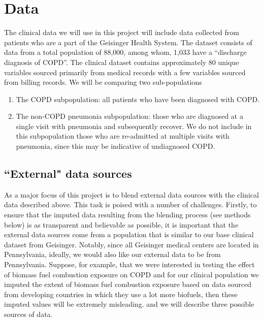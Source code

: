 \documentclass{article}
\begin{document}
\section{Data}

The clinical data we will use in this project will include data collected from patients who are a part of the Geisinger Health System. The dataset consists of data from a total population of 88,000, among whom, 1,033 have a ``discharge diagnosis of COPD''. The clinical dataset contains approximately 80 unique variables sourced primarily from medical records with a few variables sourced from billing records. We will be comparing two sub-populations

\begin{enumerate}
\item The COPD subpopulation: all patients who have been diagnosed with COPD.
\item The non-COPD pneumonia subpopulation: those who are diagnosed at a single visit with pneumonia and subsequently recover. We do not include in this subpopulation those who are re-admitted at multiple visits with pneumonia, since this may be indicative of undiagnosed COPD.
\end{enumerate}



\subsection{``External" data sources}

As a major focus of this project is to blend external data sources with the clinical data described above. This task is poised with a number of challenges. Firstly, to ensure that the imputed data resulting from the blending process (see methods below) is as transparent and believable as possible, it is important that the external data sources come from a population that is similar to our base clinical dataset from Geisinger. Notably, since all Geisinger medical centers are located in Pennsylvania, ideally, we would also like our external data to be from Pennsylvania. Suppose, for example, that we were interested in testing the effect of biomass fuel combustion exposure on COPD and for our clinical population we imputed the extent of biomass fuel combustion exposure based on data sourced from developing countries in which they use a lot more biofuels, then these imputed values will be extremely misleading. and we will describe three possible sources of data. 
\end{document}

